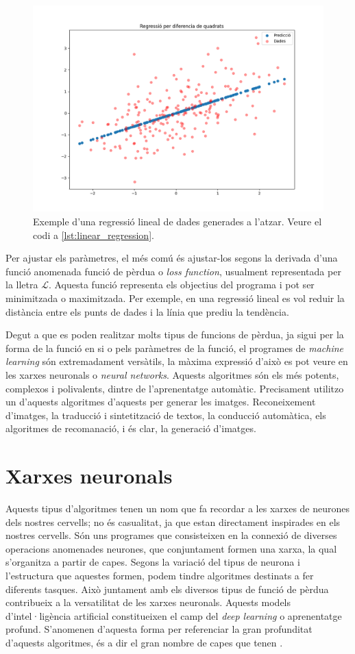 \begin{figure}
	\centering
	\includegraphics[width=0.7\linewidth]{Figures/least_squares}
	\caption{Exemple d'una regressió lineal de dades generades a l'atzar. Veure el codi a \ref{lst:linear_regression}.}
	\label{fig:leastsquares}
\end{figure}

Per ajustar els paràmetres, el més comú és ajustar-los segons la derivada d'una funció anomenada funció de pèrdua o \textit{loss function}, usualment representada per la lletra $\mathcal{L}$. Aquesta funció representa els objectius del programa i pot ser minimitzada o maximitzada. Per exemple, en una regressió lineal es vol reduir la distància entre els punts de dades i la línia que prediu la tendència.

Degut a que es poden realitzar molts tipus de funcions de pèrdua, ja sigui per la forma de la funció en si o pels paràmetres de la funció, el programes de \textit{machine learning} són extremadament versàtils, la màxima expressió d'això es pot veure en les xarxes neuronals o \textit{neural networks}. Aquests algoritmes són els més potents, complexos i polivalents, dintre de l'aprenentatge automàtic. Precisament utilitzo un d'aquests algoritmes d'aquests per generar les imatges. Reconeixement d'imatges, la traducció i sintetització de textos, la conducció automàtica, els algoritmes de recomanació, i és clar, la generació d'imatges.

\section{Xarxes neuronals}
Aquests tipus d'algoritmes tenen un nom que fa recordar a les xarxes de neurones dels nostres cervells; no és casualitat, ja que estan directament inspirades en els nostres cervells. Són uns programes que consisteixen en la connexió de diverses operacions anomenades neurones, que conjuntament formen una xarxa, la qual s'organitza a partir de capes. Segons la variació del tipus de neurona i l'estructura que aquestes formen, podem tindre algoritmes destinats a fer diferents tasques. Això juntament amb els diversos tipus de funció de pèrdua contribueix a la versatilitat de les xarxes neuronals. Aquests models d'intel·ligència artificial constitueixen el camp del \textit{deep learning} o aprenentatge profund. S'anomenen d'aquesta forma per referenciar la gran profunditat d'aquests algoritmes, és a dir el gran nombre de capes que tenen \cite{DL:feedforward}.


